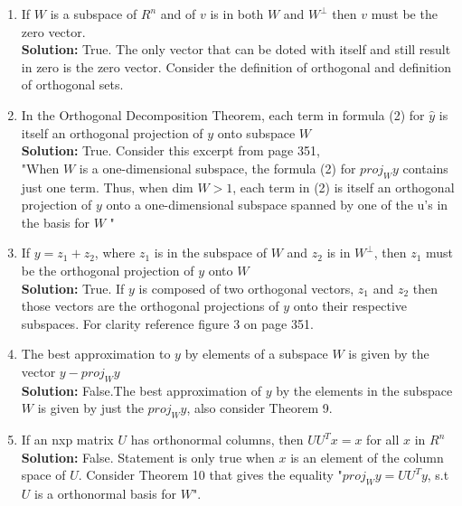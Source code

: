 \documentclass{amsart}
\begin{document}
\begin {enumerate}

\item If $W$ is a subspace of $R^n$ and of $v$ is in both $W$ and $W^\perp$ then $v$ must be the zero vector.\\
\textbf{Solution: }True. The only vector that can be doted with itself and still result in zero is the zero vector. Consider the definition of orthogonal and definition of orthogonal sets.
\vspace{1in}

\item In the Orthogonal Decomposition Theorem, each term in formula (2) for $\hat{y}$ is itself an orthogonal projection of $y$ onto subspace $W$\\
\textbf{Solution: }True. Consider this excerpt from page 351,\\

"When $W$ is a one-dimensional subspace, the formula (2) for $proj_{W}y$ contains just one term. Thus, when dim $W > 1$, each term in (2) is itself an orthogonal projection of $y$ onto a one-dimensional subspace spanned by one of the u’s in the basis for $W$ "
\vspace{1in}

\item If $y = z_1+z_2$, where $z_1$ is in the subspace of $W$ and $z_2$ is in $W^\perp$, then $z_1$ must be the orthogonal projection of $y$ onto $W$\\
\textbf{Solution: }True. If $y$ is composed of two orthogonal vectors, $z_1$ and $z_2$ then those vectors are the orthogonal projections of $y$ onto their respective subspaces. For clarity reference figure 3 on page 351.
\vspace{1in}

\item The best approximation to $y$ by elements of a subspace $W$ is given by the vector $y - proj_{W}y$\\
\textbf{Solution: }False.The best approximation of $y$ by the elements in the subspace $W$ is given by just the $proj_{W}y$, also consider Theorem 9.
\vspace{1in}

\item If an nxp matrix $U$ has orthonormal columns, then $UU^Tx = x$ for all $x$ in $R^n$\\
\textbf{Solution: } False. Statement is only true when $x$ is an element of the column space of $U$. Consider Theorem 10 that gives the equality "$proj_{W}y = UU^Ty$, s.t $U$ is a orthonormal basis for $W$". 
\vspace{1in}


\end{enumerate}
\end{document}
